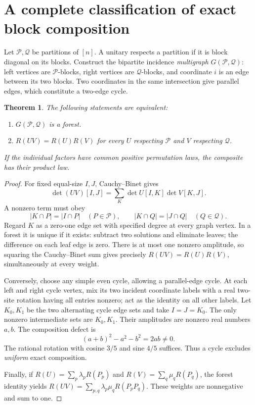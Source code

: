 \documentclass[11pt]{article}
\newtheorem{theorem}{Theorem}[section]\newtheorem{proposition}[theorem]{Proposition}
\begin{document}
\section{A complete classification of exact block composition}
Let $\mathcal P,\mathcal Q$ be partitions of $[n]$. A unitary respects a partition if it is block diagonal on its blocks. Construct the bipartite incidence \emph{multigraph} $G(\mathcal P,\mathcal Q)$: left vertices are $\mathcal P$-blocks, right vertices are $\mathcal Q$-blocks, and coordinate $i$ is an edge between its two blocks. Two coordinates in the same intersection give parallel edges, which constitute a two-edge cycle.

\begin{theorem}\label{forest}
The following statements are equivalent:
\begin{enumerate}[nosep]
\item $G(\mathcal P,\mathcal Q)$ is a forest.
\item $R(UV)=R(U)R(V)$ for every $U$ respecting $\mathcal P$ and $V$ respecting $\mathcal Q$.
\end{enumerate}
If the individual factors have common positive permutation laws, the composite has their product law.
\end{theorem}
\begin{proof}
For fixed equal-size $I,J$, Cauchy--Binet gives
\[
\det(UV)[I,J]=\sum_K \det U[I,K]\det V[K,J].
\]
A nonzero term must obey
\[
|K\cap P|=|I\cap P|\quad(P\in\mathcal P),\qquad
|K\cap Q|=|J\cap Q|\quad(Q\in\mathcal Q).
\tag{3}
\]
Regard $K$ as a zero-one edge set with specified degree at every graph vertex. In a forest it is unique if it exists: subtract two solutions and eliminate leaves; the difference on each leaf edge is zero. There is at most one nonzero amplitude, so squaring the Cauchy--Binet sum gives precisely $R(UV)=R(U)R(V)$, simultaneously at every weight.

Conversely, choose any simple even cycle, allowing a parallel-edge cycle. At each left and right cycle vertex, mix its two incident coordinate labels with a real two-site rotation having all entries nonzero; act as the identity on all other labels. Let $K_0,K_1$ be the two alternating cycle edge sets and take $I=J=K_0$. The only nonzero intermediate sets are $K_0,K_1$. Their amplitudes are nonzero real numbers $a,b$. The composition defect is
\[
(a+b)^2-a^2-b^2=2ab\ne0.
\]
The rational rotation with cosine $3/5$ and sine $4/5$ suffices. Thus a cycle excludes \emph{uniform} exact composition.

Finally, if $R(U)=\sum_p\lambda_pR(P_p)$ and $R(V)=\sum_q\mu_qR(P_q)$, the forest identity yields
$R(UV)=\sum_{p,q}\lambda_p\mu_qR(P_pP_q)$. These weights are nonnegative and sum to one.
\end{proof}
\end{document}
